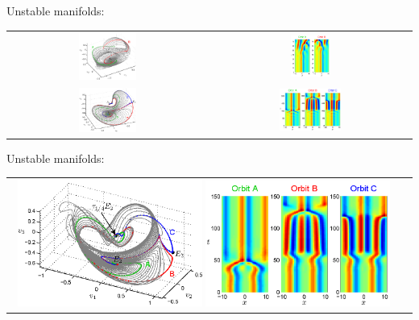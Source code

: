 \documentclass{beamer}
\begin{document}
\begin{frame}{Unstable manifolds: }
 \begin{tabular}{cc}
 \includegraphics[width=0.3\textwidth]{../../figs/ks22_E1_plane1_manifold_c} &
 \includegraphics[width=0.2\textwidth]{../../figs/ks22_E1_plane1_orbits_c}\\
 \includegraphics[width=0.3\textwidth]{../../figs/ks22_E1_plane2_manifold_c} &
 \includegraphics[width=0.32\textwidth]{../../figs/ks22_E1_plane2_orbits_c}
 \end{tabular}
\end{frame}

\begin{frame}{Unstable manifolds: }
 \begin{tabular}{cc}
 \includegraphics[width=0.48\textwidth]{../../figs/ks22_E2_manifold_c}
 \includegraphics[width=0.48\textwidth]{../../figs/ks22_E2_orbits_c}
 \end{tabular}
\end{frame}
\end{document}
